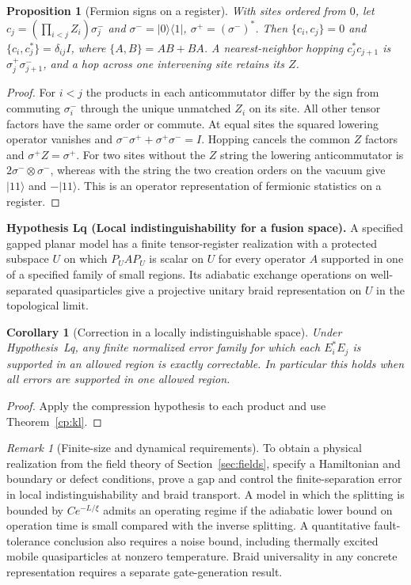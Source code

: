 \documentclass[aps,pra,onecolumn,superscriptaddress,nofootinbib,10pt]{revtex4-2}
\newtheorem{proposition}[theorem]{Proposition}
\newtheorem{corollary}[theorem]{Corollary}
\theoremstyle{definition}
\theoremstyle{remark}
\newtheorem{remark}[theorem]{Remark}
\begin{document}
\begin{proposition}[Fermion signs on a register]\label{cp:jw}
With sites ordered from $0$, let $c_j=(\prod_{i<j}Z_i)\sigma^-_j$ and $\sigma^-=|0\rangle\langle1|$, $\sigma^+=(\sigma^-)^*$. Then $\{c_i,c_j\}=0$ and $\{c_i,c_j^*\}=\delta_{ij}I$, where $\{A,B\}=AB+BA$. A nearest-neighbor hopping $c_j^*c_{j+1}$ is $\sigma^+_j\sigma^-_{j+1}$, and a hop across one intervening site retains its $Z$. \cite{n5-jw-ref}
\end{proposition}
\begin{proof}
For $i<j$ the products in each anticommutator differ by the sign from commuting $\sigma^-_i$ through the unique unmatched $Z_i$ on its site. All other tensor factors have the same order or commute. At equal sites the squared lowering operator vanishes and $\sigma^-\sigma^++\sigma^+\sigma^-=I$. Hopping cancels the common $Z$ factors and $\sigma^+Z=\sigma^+$. For two sites without the $Z$ string the lowering anticommutator is $2\sigma^-\otimes\sigma^-$, whereas with the string the two creation orders on the vacuum give $|11\rangle$ and $-|11\rangle$. This is an operator representation of fermionic statistics on a register.
\end{proof}

\smallskip\noindent\textbf{Hypothesis Lq (Local indistinguishability for a fusion space).}  A specified gapped planar model has a finite tensor-register realization with a protected subspace $U$ on which $P_U A P_U$ is scalar on $U$ for every operator $A$ supported in one of a specified family of small regions. Its adiabatic exchange operations on well-separated quasiparticles give a projective unitary braid representation on $U$ in the topological limit. \cite{n4:Nayak,n5-kitaev}


\begin{corollary}[Correction in a locally indistinguishable space]\label{cp:anyoncode}
Under Hypothesis~Lq, any finite normalized error family for which each $E_i^*E_j$ is supported in an allowed region is exactly correctable. In particular this holds when all errors are supported in one allowed region.
\end{corollary}
\begin{proof}
Apply the compression hypothesis to each product and use Theorem~\ref{cp:kl}.
\end{proof}

\begin{remark}[Finite-size and dynamical requirements]\label{cp:anyonprogramme}
To obtain a physical realization from the field theory of Section~\ref{sec:fields}, specify a Hamiltonian and boundary or defect conditions, prove a gap and control the finite-separation error in local indistinguishability and braid transport. A model in which the splitting is bounded by $C e^{-L/\xi}$ admits an operating regime if the adiabatic lower bound on operation time is small compared with the inverse splitting. A quantitative fault-tolerance conclusion also requires a noise bound, including thermally excited mobile quasiparticles at nonzero temperature. Braid universality in any concrete representation requires a separate gate-generation result. \cite{n4:Nayak}
\end{remark}
\end{document}
